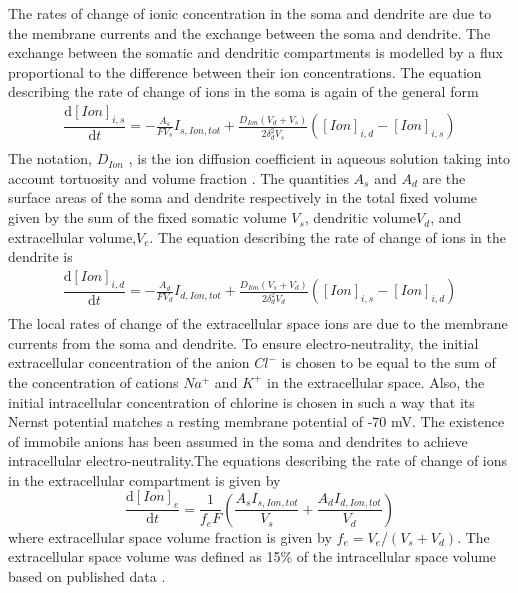 \documentclass[fleqn]{report}
\numberwithin{equation}{section}
\numberwithin{equation}{section}
\begin{document}
				The rates of change of ionic concentration in the soma and dendrite are due to the membrane currents and the exchange between the soma and dendrite. The exchange between the somatic and dendritic compartments is modelled by a flux proportional to the difference between their ion concentrations. The equation describing the rate of change of ions in the soma is again of the general form
				\begin{equation} %
				\begin{aligned}
				\dfrac{\mathrm{d} [Ion]_{i,s}}{\mathrm{d} t} = -\frac{A_s}{FV_s}I_{s,Ion,tot}+\frac{D_{Ion}(V_d+V_s)}{2\delta_d^2V_s}([Ion]_{i,d}-[Ion]_{i,s})\\
				\end{aligned}
				\end{equation}
				The notation, $ D_{Ion} $ , is the ion diffusion coefficient in aqueous solution taking into account tortuosity and volume fraction \citep{Nicholson1981}. The quantities $A_s  $ and $ A_d $ are the surface areas of the soma and dendrite respectively in the total fixed volume given by the sum of the fixed somatic volume $ V_s $, dendritic volume$ V_d $, and extracellular volume,$ V_e $. The equation describing the rate of change of ions in the dendrite is  
				\begin{equation} %
				\begin{aligned}
				\dfrac{\mathrm{d} [Ion]_{i,d}}{\mathrm{d} t} = -\frac{A_d}{FV_d}I_{d,Ion,tot}+\frac{D_{Ion}(V_s+V_d)}{2\delta_d^2V_d}([Ion]_{i,s}-[Ion]_{i,d})\\
				\end{aligned}
				\end{equation}
				The local rates of change of the extracellular space ions are due to the membrane currents from the soma and dendrite.  To ensure electro-neutrality, the initial extracellular concentration of the anion $ Cl^- $ is chosen to be equal to the sum of the concentration of cations $Na^+ $ and $K^+ $ in the extracellular space. Also, the initial intracellular concentration of chlorine is chosen in such a way that its Nernst potential matches a resting membrane potential of -70 mV. The existence of immobile anions has been assumed in the soma and dendrites to achieve intracellular electro-neutrality.The equations describing the rate of change of ions in the extracellular compartment is given by
				\begin{equation} %
				\dfrac{\mathrm{d} [Ion]_{e}}{\mathrm{d} t} = \frac{1}{f_eF}\left(\frac{A_sI_{s,Ion,tot}}{V_s}+\frac{A_dI_{d,Ion,tot}
				}{V_d}\right)
				\end{equation}
				where extracellular space volume fraction is given by $ f_e={V_e}$/${(V_s+V_d)} $. The extracellular space volume was defined as 15\% of the intracellular  space volume based on published data \citep{Mazel1998,McBain1990}.
				
\end{document}
